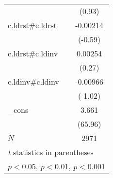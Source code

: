 {\begin{tabular}{l*{1}{c}}
            &      (0.93)         \\
[1em]
c.ldrst#c.ldrst&    -0.00214         \\
            &     (-0.59)         \\
[1em]
c.ldrst#c.ldinv&     0.00254         \\
            &      (0.27)         \\
[1em]
c.ldinv#c.ldinv&    -0.00966         \\
            &     (-1.02)         \\
[1em]
\_cons      &       3.661\sym{***}\\
            &     (65.96)         \\
\hline
\(N\)       &        2971         \\
\hline\hline
\multicolumn{2}{l}{\footnotesize \textit{t} statistics in parentheses}\\
\multicolumn{2}{l}{\footnotesize \sym{*} \(p<0.05\), \sym{**} \(p<0.01\), \sym{***} \(p<0.001\)}\\
\end{tabular}
}

